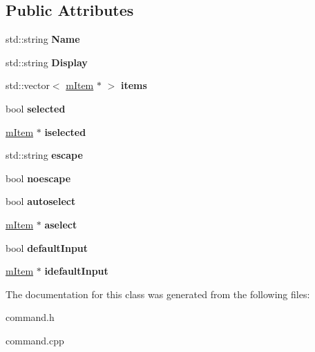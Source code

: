 \subsection*{Public Attributes}
\begin{DoxyCompactItemize}
\item 
std\+::string {\bfseries Name}\hypertarget{classmenu_a760df68a86d11000119480a0aa66bc60}{}\label{classmenu_a760df68a86d11000119480a0aa66bc60}

\item 
std\+::string {\bfseries Display}\hypertarget{classmenu_ac08be8fbaeadae2865341e72d6931be1}{}\label{classmenu_ac08be8fbaeadae2865341e72d6931be1}

\item 
std\+::vector$<$ \hyperlink{classmItem}{m\+Item} $\ast$ $>$ {\bfseries items}\hypertarget{classmenu_a7e153ee97a39c1814eda84800a148471}{}\label{classmenu_a7e153ee97a39c1814eda84800a148471}

\item 
bool {\bfseries selected}\hypertarget{classmenu_a71c8e92b51cbae2f46f3f612960be840}{}\label{classmenu_a71c8e92b51cbae2f46f3f612960be840}

\item 
\hyperlink{classmItem}{m\+Item} $\ast$ {\bfseries iselected}\hypertarget{classmenu_a39e3b188f7e064329274189308154f5d}{}\label{classmenu_a39e3b188f7e064329274189308154f5d}

\item 
std\+::string {\bfseries escape}\hypertarget{classmenu_ab5742e4d6f82384d4fcf9fe4db782bb3}{}\label{classmenu_ab5742e4d6f82384d4fcf9fe4db782bb3}

\item 
bool {\bfseries noescape}\hypertarget{classmenu_a5412b63f75cd2152dd8973dbe2c12e02}{}\label{classmenu_a5412b63f75cd2152dd8973dbe2c12e02}

\item 
bool {\bfseries autoselect}\hypertarget{classmenu_afa772336c01e7778c4b0cc70587d3156}{}\label{classmenu_afa772336c01e7778c4b0cc70587d3156}

\item 
\hyperlink{classmItem}{m\+Item} $\ast$ {\bfseries aselect}\hypertarget{classmenu_a4e5def5788f20e768c5358b5523f9fd7}{}\label{classmenu_a4e5def5788f20e768c5358b5523f9fd7}

\item 
bool {\bfseries default\+Input}\hypertarget{classmenu_a45a911e85247aca60905b1a782674c38}{}\label{classmenu_a45a911e85247aca60905b1a782674c38}

\item 
\hyperlink{classmItem}{m\+Item} $\ast$ {\bfseries idefault\+Input}\hypertarget{classmenu_a095c93d2298a131ea8a875fee5ac44e1}{}\label{classmenu_a095c93d2298a131ea8a875fee5ac44e1}

\end{DoxyCompactItemize}


The documentation for this class was generated from the following files\+:\begin{DoxyCompactItemize}
\item 
command.\+h\item 
command.\+cpp\end{DoxyCompactItemize}
